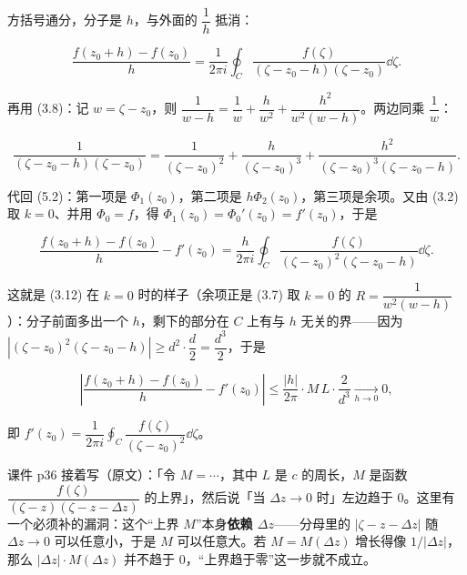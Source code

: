 \documentclass[11pt]{ctexart}
\let\origsubhdr\subhdr
\renewcommand{\subhdr}[1]{\par\origsubhdr{#1}}
\begin{document}
方括号通分，分子是 $h$，与外面的 $\dfrac1h$ 抵消：

\begin{equation}
\frac{f(z_0+h)-f(z_0)}{h}
=\frac{1}{2\pi i}\oint_C\frac{f(\zeta)}{(\zeta-z_0-h)(\zeta-z_0)}\dd\zeta .
\tag{5.2}
\end{equation}

再用 (3.8)：记 $w=\zeta-z_0$，则 $\dfrac{1}{w-h}=\dfrac1w+\dfrac{h}{w^{2}}+\dfrac{h^{2}}{w^{2}(w-h)}$。两边同乘 $\dfrac1w$：

\begin{equation*}
\frac{1}{(\zeta-z_0-h)(\zeta-z_0)}
=\frac{1}{(\zeta-z_0)^{2}}+\frac{h}{(\zeta-z_0)^{3}}+\frac{h^{2}}{(\zeta-z_0)^{3}(\zeta-z_0-h)} .
\end{equation*}

代回 (5.2)：第一项是 $\Phi_1(z_0)$，第二项是 $h\Phi_2(z_0)$，第三项是余项。又由 (3.2) 取 $k=0$、并用 $\Phi_0=f$，得 $\Phi_1(z_0)=\Phi_0'(z_0)=f'(z_0)$，于是

\begin{equation}
\frac{f(z_0+h)-f(z_0)}{h}-f'(z_0)
=\frac{h}{2\pi i}\oint_C\frac{f(\zeta)}{(\zeta-z_0)^{2}(\zeta-z_0-h)}\dd\zeta .
\tag{5.3}
\end{equation}

这就是 (3.12) 在 $k=0$ 时的样子（余项正是 (3.7) 取 $k=0$ 的 $R=\dfrac{1}{w^{2}(w-h)}$）：分子前面多出一个 $h$，剩下的部分在 $C$ 上有与 $h$ 无关的界——因为 $|(\zeta-z_0)^{2}(\zeta-z_0-h)|\ge d^{2}\cdot\dfrac{d}{2}=\dfrac{d^{3}}{2}$，于是

\begin{equation*}
\left|\frac{f(z_0+h)-f(z_0)}{h}-f'(z_0)\right|\le\frac{|h|}{2\pi}\cdot M\,L\cdot\frac{2}{d^{3}}\xrightarrow[h\to0]{}0 ,
\end{equation*}

即 $f'(z_0)=\dfrac{1}{2\pi i}\displaystyle\oint_C\dfrac{f(\zeta)}{(\zeta-z_0)^{2}}\dd\zeta$。



课件 p36 接着写（原文）：「令 $M=\cdots$，其中 $L$ 是 $c$ 的周长，$M$ 是函数 $\dfrac{f(\zeta)}{(\zeta-z)(\zeta-z-\Delta z)}$ 的上界」，然后说「当 $\Delta z\to0$ 时」左边趋于 $0$。这里有一个必须补的漏洞：这个“上界 $M$”本身\textbf{依赖 $\Delta z$}——分母里的 $|\zeta-z-\Delta z|$ 随 $\Delta z\to0$ 可以任意小，于是 $M$ 可以任意大。若 $M=M(\Delta z)$ 增长得像 $1/|\Delta z|$，那么 $|\Delta z|\cdot M(\Delta z)$ 并不趋于 $0$，“上界趋于零”这一步就不成立。
\end{document}
